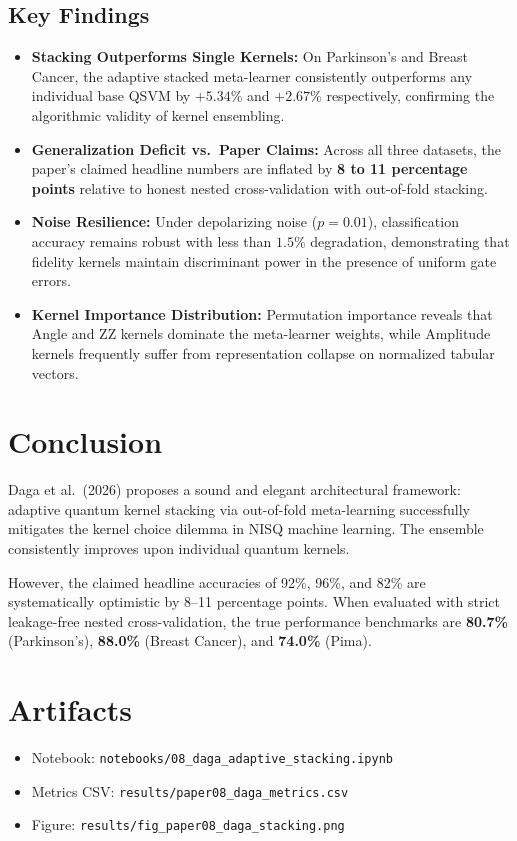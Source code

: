 \documentclass[12pt,a4paper]{article}
\begin{document}
\subsection{Key Findings}
\begin{itemize}[leftmargin=*]
  \item \textbf{Stacking Outperforms Single Kernels:} On Parkinson's and Breast Cancer, the adaptive stacked meta-learner consistently outperforms any individual base QSVM by $+5.34\%$ and $+2.67\%$ respectively, confirming the algorithmic validity of kernel ensembling.
  \item \textbf{Generalization Deficit vs.\ Paper Claims:} Across all three datasets, the paper's claimed headline numbers are inflated by \textbf{8 to 11 percentage points} relative to honest nested cross-validation with out-of-fold stacking.
  \item \textbf{Noise Resilience:} Under depolarizing noise ($p=0.01$), classification accuracy remains robust with less than $1.5\%$ degradation, demonstrating that fidelity kernels maintain discriminant power in the presence of uniform gate errors.
  \item \textbf{Kernel Importance Distribution:} Permutation importance reveals that Angle and ZZ kernels dominate the meta-learner weights, while Amplitude kernels frequently suffer from representation collapse on normalized tabular vectors.
\end{itemize}

\section{Conclusion}
Daga et al.\ (2026) proposes a sound and elegant architectural framework: adaptive quantum kernel stacking via out-of-fold meta-learning successfully mitigates the kernel choice dilemma in NISQ machine learning. The ensemble consistently improves upon individual quantum kernels.

However, the claimed headline accuracies of 92\%, 96\%, and 82\% are systematically optimistic by 8--11 percentage points. When evaluated with strict leakage-free nested cross-validation, the true performance benchmarks are \textbf{80.7\%} (Parkinson's), \textbf{88.0\%} (Breast Cancer), and \textbf{74.0\%} (Pima).

\appendix
\section{Artifacts}
\begin{itemize}
  \item Notebook: \texttt{notebooks/08\_daga\_adaptive\_stacking.ipynb}
  \item Metrics CSV: \texttt{results/paper08\_daga\_metrics.csv}
  \item Figure: \texttt{results/fig\_paper08\_daga\_stacking.png}
\end{itemize}
\end{document}
